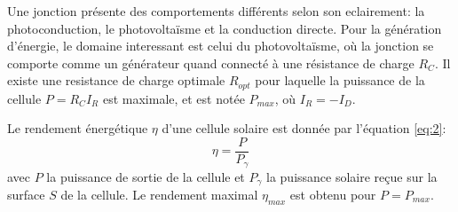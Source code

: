 Une jonction présente des comportements différents selon son eclairement: la photoconduction, le photovoltaïsme et la conduction directe.
Pour la génération d'énergie, le domaine interessant est celui du photovoltaïsme, où la jonction se comporte comme un générateur quand connecté à une résistance de charge \(R_C\).
Il existe une resistance de charge optimale \(R_{opt}\) pour laquelle la puissance de la cellule \(P = R_C I_R\) est maximale, et est notée \(P_{max}\), où \(I_R = -I_D\).

Le rendement énergétique \(\eta\) d'une cellule solaire est donnée par l'équation \ref{eq:2}:
\begin{equation}
    \eta = \frac{P}{P_\gamma}
    \label{eq:2}
\end{equation}
avec \(P\) la puissance de sortie de la cellule et \(P_\gamma\) la puissance solaire reçue sur la surface \(S\) de la cellule.
Le rendement maximal \(\eta_{max}\) est obtenu pour \(P = P_{max}\).
